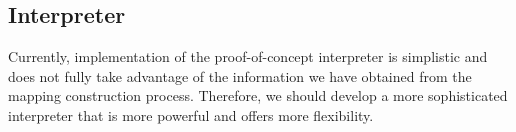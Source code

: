 \subsection{Interpreter}
Currently, implementation of the proof-of-concept interpreter is simplistic and does not fully take advantage of the information we have obtained from the mapping construction process. Therefore, we should develop a more sophisticated interpreter that is more powerful and offers more flexibility.

